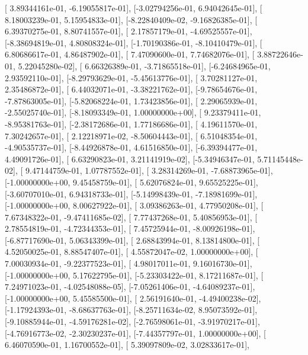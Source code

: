 \documentclass{article}
\begin{document}
       [ 3.89344161e-01, -6.19055817e-01],
       [-3.02794256e-01,  6.94042645e-01],
       [ 8.18003239e-01,  5.15954833e-01],
       [-8.22840409e-02, -9.16826385e-01],
       [ 6.39370275e-01,  8.80741557e-01],
       [ 2.17857179e-01, -4.69525557e-01],
       [-8.38694819e-01,  4.80808324e-01],
       [-1.70190386e-01, -8.10410479e-01],
       [ 6.80686617e-01,  4.86487902e-01],
       [ 7.47090600e-01,  7.74682076e-01],
       [ 3.88722646e-01,  5.22045280e-02],
       [ 6.66326389e-01, -3.71865518e-01],
       [-6.24684965e-01,  2.93592110e-01],
       [-8.29793629e-01, -5.45613776e-01],
       [ 3.70281127e-01,  2.35486872e-01],
       [ 6.44032071e-01, -3.38221762e-01],
       [-9.78654676e-01, -7.87863005e-01],
       [-5.82068224e-01,  1.73423856e-01],
       [ 2.29065939e-01, -2.55025740e-01],
       [-8.18093349e-01,  1.00000000e+00],
       [ 9.23379411e-01, -8.95381763e-01],
       [-2.38172686e-01,  1.77186686e-01],
       [ 4.19611570e-01,  7.30242657e-01],
       [ 2.12218971e-02, -8.50604443e-01],
       [ 6.51048354e-01, -4.90535737e-01],
       [-8.44926878e-01,  4.61516850e-01],
       [-6.39394477e-01,  4.49091726e-01],
       [ 6.63290823e-01,  3.21141919e-02],
       [-5.34946347e-01,  5.71145448e-02],
       [ 9.47144759e-01,  1.07787552e-01],
       [ 3.28314269e-01, -7.68873965e-01],
       [-1.00000000e+00,  9.45458759e-01],
       [ 5.62076824e-01,  9.65525225e-01],
       [-3.60707010e-01,  6.94318733e-01],
       [-5.14998439e-01, -7.18981699e-01],
       [-1.00000000e+00,  8.00627922e-01],
       [ 3.09386263e-01,  4.77950208e-01],
       [ 7.67348322e-01, -9.47411685e-02],
       [ 7.77437268e-01,  5.40856953e-01],
       [ 2.78554819e-01, -4.72344353e-01],
       [ 7.45725944e-01, -8.00926198e-01],
       [-6.87717690e-01,  5.06343399e-01],
       [ 2.68843994e-01,  8.13814800e-01],
       [ 4.52050025e-01,  8.88547407e-01],
       [ 4.55872047e-02,  1.00000000e+00],
       [ 7.00030934e-01, -9.22377523e-01],
       [ 4.98017011e-01,  9.16016730e-01],
       [-1.00000000e+00,  5.17622795e-01],
       [-5.23303422e-01,  8.17211687e-01],
       [ 7.24971023e-01, -4.02548088e-05],
       [-7.05261406e-01, -4.64089237e-01],
       [-1.00000000e+00,  5.45585500e-01],
       [ 2.56191640e-01, -4.49400238e-02],
       [-1.17924393e-01, -8.68637763e-01],
       [-8.25711634e-02,  8.95073592e-01],
       [-9.10885944e-01, -4.59176281e-02],
       [-2.76598061e-01, -3.91970217e-01],
       [-4.76916773e-02, -2.30230237e-01],
       [-7.44357797e-01,  1.00000000e+00],
       [ 6.46070590e-01,  1.16700552e-01],
       [ 5.39097809e-02,  3.02833617e-01],
\end{document}
